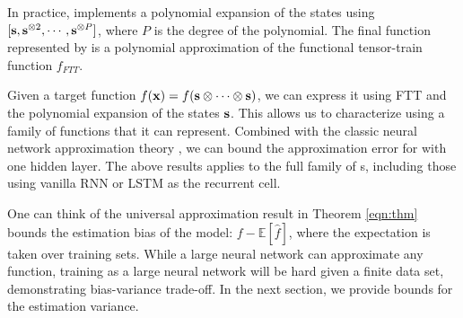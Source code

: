 In practice, \trnn{} implements a polynomial expansion of the states using $[{\mathbf{s}}, {\mathbf{s}}^{\otimes 2}, \cdots, {\mathbf{s}}^{\otimes P}]$, where $P$ is the degree of the polynomial. The final function represented by \trnn{} is a polynomial approximation of the functional tensor-train function $f_{FTT}$. 

Given a target  function $f({\mathbf{x}}) = f({\mathbf{s}}\otimes \dots \otimes {\mathbf{s}})$, we can express it using FTT and the polynomial expansion of the states ${\mathbf{s}}$. This allows us to characterize \trnn{} using a family of functions that it can represent.  Combined with the classic neural network approximation theory \cite{barron1993universal}, we can bound the approximation error for \trnn{} with one hidden layer. The above results applies to the full family of \trnn{}s, including those using  vanilla RNN or LSTM as the recurrent cell.

One can think of the universal approximation result in Theorem \ref{eqn:thm} bounds the estimation bias of the model: $f-\mathbb{E} [\hat{f}]$, where the expectation is taken over training sets. While a large neural network can approximate any function, training as a large neural network will be hard given a finite data set, demonstrating bias-variance trade-off. In the next section, we provide bounds for the estimation variance. 
 
%
%
% 



